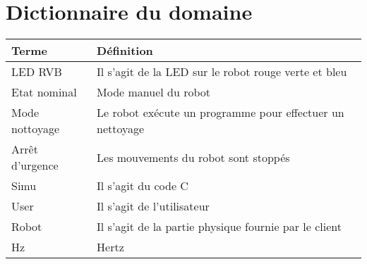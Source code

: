 \section{Dictionnaire du domaine}

\begin{tabularx}{\textwidth}{|X|X|}
    \hline
    \textbf{Terme} & \textbf{Définition} \\
    \hline
    LED RVB & Il s'agit de la LED sur le robot rouge verte et bleu \\
    \hline
    Etat nominal & Mode manuel du robot  \\
    \hline
    Mode nottoyage & Le robot exécute un programme pour effectuer un nettoyage \\
    \hline
    Arrêt d'urgence & Les mouvements du robot sont stoppés \\
    \hline
    Simu & Il s'agit du code C \\
    \hline
    User & Il s'agit de l'utilisateur \\
    \hline
    Robot & Il s'agit de la partie physique fournie par le client \\
    \hline
    Hz & Hertz \\
    \hline
\end{tabularx}